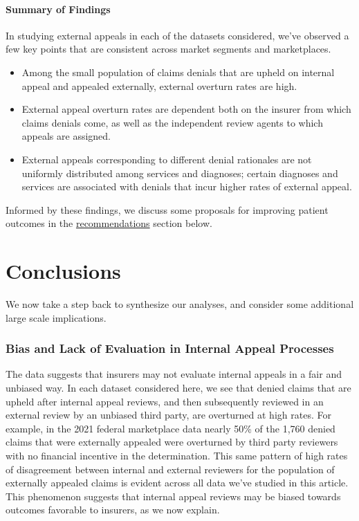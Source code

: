 \documentclass[12pt, a4paper,twoside,parskip=full]{report}
\theoremstyle{plain} %
\theoremstyle{definition} %
\theoremstyle{remark} %
\numberwithin{equation}{chapter}
\begin{document}
		\subsubsection{Summary of Findings}
		
		In studying external appeals in each of the datasets considered, we've observed a few key points
		that are consistent across market segments and marketplaces.
		
		\begin{itemize}
			\item Among the small population of claims denials that are upheld on internal appeal and appealed externally, 
			external overturn rates are high.
			\item External appeal overturn rates are dependent both on the insurer from which claims denials come,
			as well as the independent review agents to which appeals are assigned.
			\item External appeals corresponding to different denial rationales are not uniformly distributed among
			services and diagnoses; certain diagnoses and services are associated with denials that
			incur higher rates of external appeal.
		\end{itemize}
		
		Informed by these findings, we discuss some proposals for improving patient outcomes 
		in the \hyperref[recommendations]{recommendations} section below.
		
		
		\chapter{Conclusions}\label{conclusions}
		
		We now take a step back to synthesize our analyses, and consider some additional large scale implications.
		
		\subsection{Bias and Lack of Evaluation in Internal Appeal Processes}
		
		The data suggests that insurers may not evaluate internal appeals in a fair and unbiased way. In each dataset considered here, we see that denied claims that are upheld after internal appeal reviews, and then subsequently reviewed in an external review by an unbiased third party, are overturned at high rates. For example, in the 2021 federal marketplace data nearly 50\% of the 1,760 denied claims that were externally appealed were overturned by third party reviewers with no financial incentive in the determination. This same pattern of high rates of disagreement between internal and external reviewers for the population of externally appealed claims is evident across all data we've studied in this article. This phenomenon suggests that internal appeal reviews may be biased towards outcomes favorable to insurers, as we now explain.
		
\end{document}
